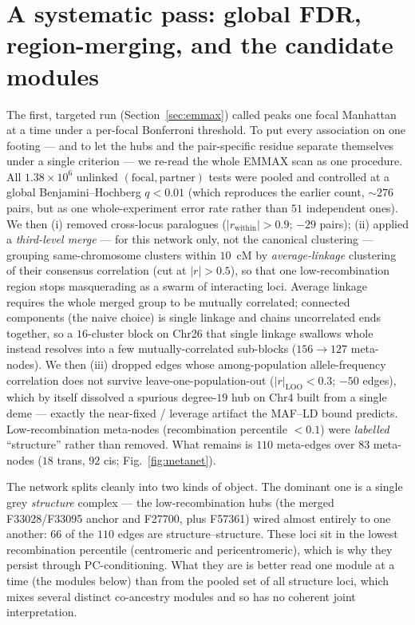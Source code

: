 \documentclass[11pt]{article}
\begin{document}
\section{A systematic pass: global FDR, region-merging, and the candidate modules}
\label{sec:metanet}

The first, targeted run (Section~\ref{sec:emmax}) called peaks one focal Manhattan at a
time under a per-focal Bonferroni threshold. To put every association on one footing ---
and to let the hubs and the pair-specific residue separate themselves under a single
criterion --- we re-read the whole EMMAX scan as one procedure. All $1.38\times10^{6}$ unlinked $(\text{focal},
\text{partner})$ tests were pooled and controlled at a global Benjamini--Hochberg
$q<0.01$ (which reproduces the earlier count, ${\sim}276$ pairs, but as one
whole-experiment error rate rather than $51$ independent ones). We then (i) removed
cross-locus paralogues ($|r_{\mathrm{within}}|>0.9$; $-29$ pairs); (ii) applied a
\emph{third-level merge} --- for this network only, not the canonical clustering ---
grouping same-chromosome clusters within $10$~cM by \emph{average-linkage} clustering of
their consensus correlation (cut at $|r|>0.5$), so that one low-recombination region stops
masquerading as a swarm of interacting loci. Average linkage requires the whole merged
group to be mutually correlated; connected components (the naive choice) is single linkage
and chains uncorrelated ends together, so a $16$-cluster block on Chr26 that single linkage
swallows whole instead resolves into a few mutually-correlated sub-blocks
($156\to127$ meta-nodes). We then (iii) dropped edges whose among-population
allele-frequency correlation does not survive leave-one-population-out
($|r|_{\mathrm{LOO}}<0.3$; $-50$ edges), which by itself dissolved a spurious degree-$19$
hub on Chr4 built from a single deme --- exactly the near-fixed / leverage artifact the
MAF--LD bound predicts. Low-recombination meta-nodes (recombination percentile $<0.1$)
were \emph{labelled} ``structure'' rather than removed. What remains is $110$ meta-edges
over $83$ meta-nodes ($18$ trans, $92$ cis; Fig.~\ref{fig:metanet}).

The network splits cleanly into two kinds of object. The dominant one is a single grey
\emph{structure} complex --- the low-recombination hubs
(the merged F33028/F33095 anchor and F27700, plus F57361) wired almost entirely to one
another: $66$ of the $110$ edges are structure--structure. These loci sit in the lowest
recombination percentile (centromeric and pericentromeric), which is why they persist
through PC-conditioning. What they are is better read one module at a time (the modules
below) than from the pooled set of all structure loci, which mixes several distinct
co-ancestry modules and so has no coherent joint interpretation.
\end{document}
